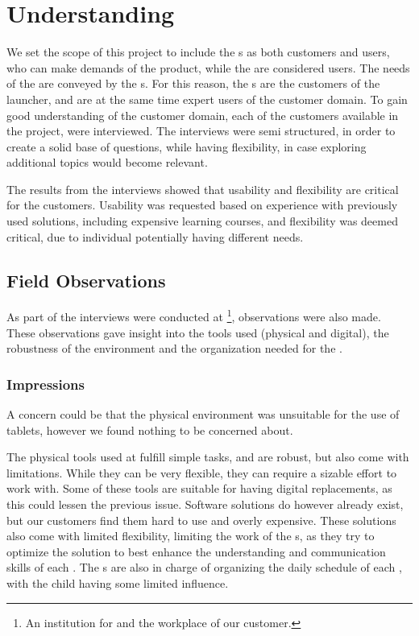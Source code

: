 \section{Understanding}
\label{interviews}

We set the scope of this project to include the \guardian[]s as both customers and users, who can make demands of the product, while the \autists[] are considered users. 
The needs of the \autists[] are conveyed by the \guardian[]s.
For this reason, the \guardian[]s are the customers of the \giraf[] launcher, and are at the same time expert users of the customer domain. 
To gain good understanding of the customer domain, each of the customers available in the project, were interviewed. 
The interviews were semi structured, in order to create a solid base of questions, while having flexibility, in case exploring additional topics would become relevant. \citep[p. 152]{dieb-book}

The results from the interviews showed that usability and flexibility are critical for the customers. 
Usability was requested based on experience with previously used solutions, including expensive learning courses, and flexibility was deemed critical, due to individual \autists[] potentially having different needs.

\subsection{Field Observations}
As part of the interviews were conducted at \egebakken{}\footnote{An institution for \autists[] and the workplace of our customer.}, observations were also made. 
These observations gave insight into the tools used (physical and digital), the robustness of the environment and the organization needed for the \autists[]. 

\subsubsection{Impressions}
A concern could be that the physical environment was unsuitable for the use of tablets, however we found nothing to be concerned about.

The physical tools used at \egebakken{} fulfill simple tasks, and are robust, but also come with limitations. 
While they can be very flexible, they can require a sizable effort to work with. 
Some of these tools are suitable for having digital replacements, as this could lessen the previous issue. 
Software solutions do however already exist, but our customers find them hard to use and overly expensive. 
These solutions also come with limited flexibility, limiting the work of the \guardian[]s, as they try to optimize the solution to best enhance the understanding and communication skills of each \autist[]. 
The \guardian[]s are also in charge of organizing the daily schedule of each \autist[], with the child having some limited influence. 